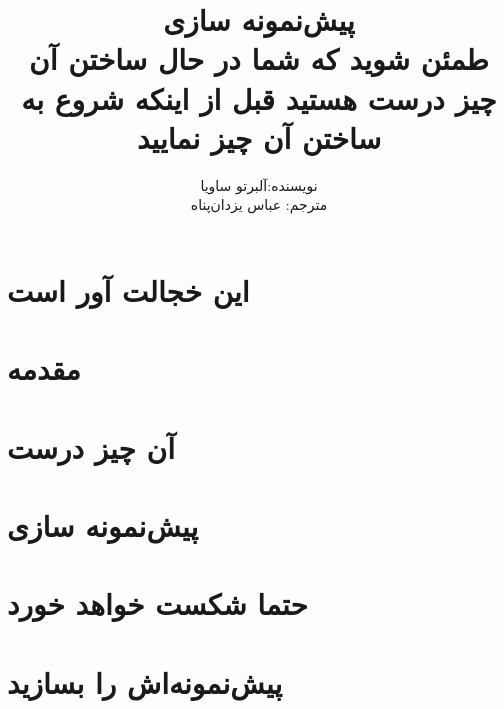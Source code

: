 \documentclass[a5paper,14pt]{book}
\author{نویسنده:آلبرتو ساویا
\\ مترجم: عباس یزدان‌پناه}
\title{پیش‌نمونه سازی
\\
طمئن شوید که شما در حال ساختن  آن چیز درست هستید قبل از اینکه شروع به ساختن آن چیز نمایید}
\begin{document}
\maketitle
\frontmatter
\tableofcontents

\chapter{این خجالت آور است}

\chapter{مقدمه}

\mainmatter
\chapter{آن چیز درست}

\chapter{پیش‌نمونه سازی}

\chapter{حتما شکست خواهد خورد}

\chapter{پیش‌نمونه‌اش را بسازید}

\end{document}
